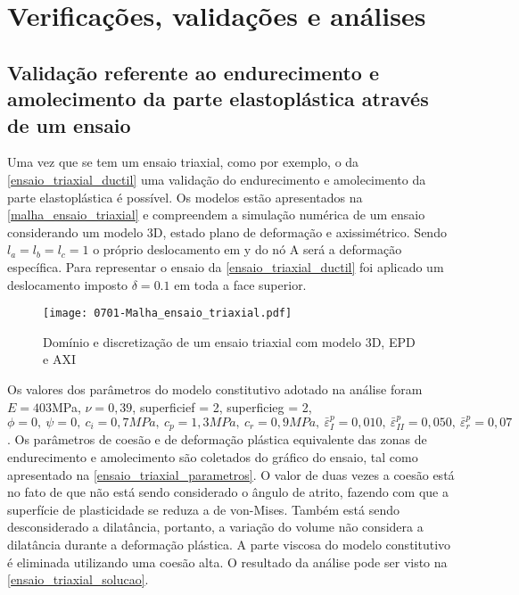 \chapter{Verificações, validações e análises}\label{Algumas_verificacoes_validacoes}

\section{Validação referente ao endurecimento e amolecimento da parte elastoplástica através de um ensaio}

Uma vez que se tem um ensaio triaxial, como por exemplo, o da \autoref{ensaio_triaxial_ductil} uma validação do endurecimento e amolecimento da parte elastoplástica é possível. Os modelos estão apresentados na \autoref{malha_ensaio_triaxial} e compreendem a simulação numérica de um ensaio considerando um modelo 3D, estado plano de deformação e axissimétrico. Sendo $l_a = l_b = l_c = 1$ o próprio deslocamento em y do nó A será a deformação específica. Para representar o ensaio da \autoref{ensaio_triaxial_ductil} foi aplicado um deslocamento imposto $\delta = 0.1$ em toda a face superior.

\begin{figure}[H]
	\begin{center}
		\texttt{[image: 0701-Malha\_ensaio\_triaxial.pdf]}
	\end{center}
	\caption{\label{malha_ensaio_triaxial}Domínio e discretização de um ensaio triaxial com modelo 3D, EPD e AXI}
\end{figure}

Os valores dos parâmetros do modelo constitutivo adotado na análise foram $E = 403$MPa, $\nu = 0,39$,  superficief = 2, superficieg = 2, $\phi = 0,~\psi = 0,~c_i = 0,7MPa,~c_p = 1,3MPa,~c_r = 0,9MPa,~\bar \varepsilon^p_{I} = 0,010,~\bar \varepsilon^p_{II} = 0,050,~\bar \varepsilon^p_{r} = 0,07$. Os parâmetros de coesão e de deformação plástica equivalente das zonas de endurecimento e amolecimento são coletados do gráfico do ensaio, tal como apresentado na \autoref{ensaio_triaxial_parametros}. O valor de duas vezes a coesão está no fato de que não está sendo considerado o ângulo de atrito, fazendo com que a superfície de plasticidade se reduza a de von-Mises. Também está sendo desconsiderado a dilatância, portanto, a variação do volume não considera a dilatância durante a deformação plástica. A parte viscosa do modelo constitutivo é eliminada utilizando uma coesão alta. O resultado da análise pode ser visto na \autoref{ensaio_triaxial_solucao}.
 
